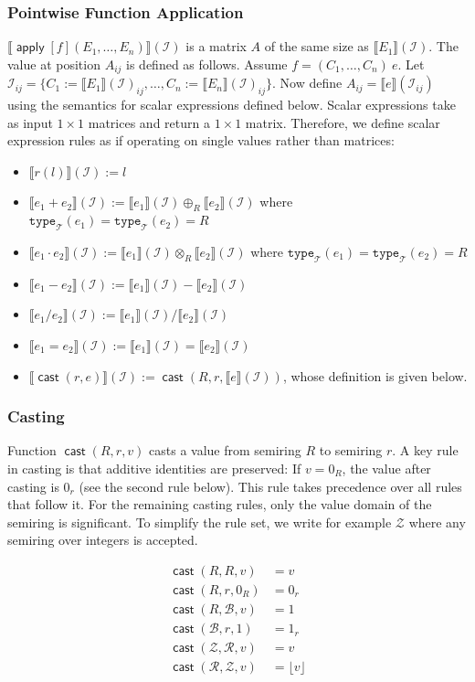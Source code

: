 \documentclass{article}
\DeclareMathOperator{\cast}{\mathsf{cast}}
\newcommand{\tenv}{\mathcal{T}}
\newcommand{\ttypet}{\texttt{type}_{\tenv}}
\DeclareMathOperator{\Apply}{\mathsf{apply}}
\newcommand{\I}{\mathcal{I}}
\newcommand{\sem}[2]{\llbracket #1 \rrbracket(#2)}
\begin{document}
\subsubsection*{Pointwise Function Application}
$\sem{\Apply[f](E_1,\ldots ,E_n)}{\I}$ is a matrix $A$ of the same size as $\sem{E_1}{\I}$.
The value at position $A_{ij}$ is defined as follows.
Assume $f = (C_1,\ldots,C_n)\ e$.
Let $\I_{ij} = \{ C_1 := \sem{E_1}{\I}_{ij},\ldots, C_n := \sem{E_n}{\I}_{ij} \}$.
Now define $A_{ij} = \sem{e}{\I_{ij}}$ using the semantics for scalar expressions defined below.
Scalar expressions take as input $1 \times 1$ matrices and return a $1 \times 1$ matrix.
Therefore, we define scalar expression rules as if operating on single values rather than matrices:

\begin{itemize}
    \item $\sem{r(l)}{\I} := l$
    \item $\sem{e_1 + e_2}{\I} := \sem{e_1}{\I} \oplus_R \sem{e_2}{\I}$ where $\ttypet(e_1) = \ttypet(e_2) = R$
    \item $\sem{e_1 \cdot e_2}{\I} := \sem{e_1}{\I} \otimes_R \sem{e_2}{\I}$ where $\ttypet(e_1) = \ttypet(e_2) = R$
    \item $\sem{e_1 - e_2}{\I} := \sem{e_1}{\I} - \sem{e_2}{\I}$
    \item $\sem{e_1 / e_2}{\I} := \sem{e_1}{\I} / \sem{e_2}{\I}$
    \item $\sem{e_1 = e_2}{\I} := \sem{e_1}{\I} = \sem{e_2}{\I}$
    \item $\sem{\cast(r, e)}{\I} := \cast(R, r, \sem{e}{\I})$, whose definition is given below.
\end{itemize}

\subsubsection*{Casting}
Function $\cast(R, r, v)$ casts a value from semiring $R$ to semiring $r$.
A key rule in casting is that additive identities are preserved: If $v = 0_R$, the value after casting is $0_r$ (see the second rule below).
This rule takes precedence over all rules that follow it.
For the remaining casting rules, only the value domain of the semiring is significant.
To simplify the rule set, we write for example $\mathcal{Z}$ where any semiring over integers is accepted.

\begin{align*}
    \cast(R, R, v)                     & = v                 \\
    \cast(R, r, 0_R)                   & = 0_r               \\
    \cast(R, \mathcal{B}, v)           & = 1                 \\
    \cast(\mathcal{B}, r, 1)           & = 1_r               \\
    \cast(\mathcal{Z}, \mathcal{R}, v) & = v                 \\
    \cast(\mathcal{R}, \mathcal{Z}, v) & = \lfloor v \rfloor \\
\end{align*}
\end{document}
